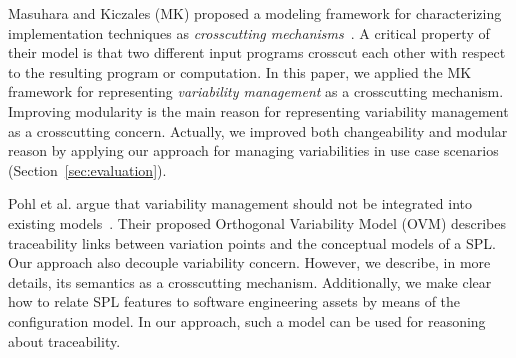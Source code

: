 \documentclass[11pt]{report}
\begin{document}

Masuhara and Kiczales (MK) proposed a modeling framework 
for characterizing implementation techniques as 
\emph{crosscutting mechanisms}~\cite{kiczales-ecoop-2003}. 
A critical property of their model is that two different input 
programs crosscut each other with respect to the resulting 
program or computation. 
In this paper, we applied the MK framework for representing
\emph{variability management} as a crosscutting mechanism. Improving 
modularity is the main reason for representing variability management 
as a crosscutting concern. Actually, we improved both changeability and 
modular reason by applying our approach for managing variabilities 
in use case scenarios (Section~\ref{sec:evaluation}). 


Pohl et al. argue that variability management should not be
integrated into existing models~\cite{phol-spl-book}. Their proposed
Orthogonal Variability Model (OVM) describes traceability links
between variation points and the conceptual models of a SPL. Our
approach also decouple variability concern. However, we describe, in more
details, its semantics as a crosscutting mechanism. Additionally, we make
clear how to relate SPL features to software engineering assets by means of the
configuration model. In our approach, such a model can be used for reasoning 
about traceability.

\end{document}
